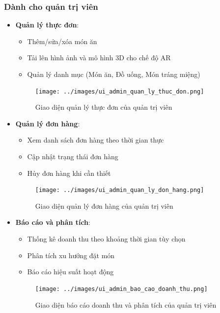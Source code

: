 \documentclass[12pt,a4paper]{article}
\begin{document}
\subsubsection{Dành cho quản trị viên}
\begin{itemize}[leftmargin=1cm]
    \item \textbf{Quản lý thực đơn}:
        \begin{itemize}[leftmargin=0.5cm]
            \item Thêm/sửa/xóa món ăn
            \item Tải lên hình ảnh và mô hình 3D cho chế độ AR
            \item Quản lý danh mục (Món ăn, Đồ uống, Món tráng miệng)
        \end{itemize}
\begin{figure}[H]
    \centering
    \texttt{[image: ../images/ui\_admin\_quan\_ly\_thuc\_don.png]} %
    \caption{Giao diện quản lý thực đơn của quản trị viên}
    \label{fig:ui_admin_menu}
\end{figure}

    \item \textbf{Quản lý đơn hàng}:
        \begin{itemize}[leftmargin=0.5cm]
            \item Xem danh sách đơn hàng theo thời gian thực
            \item Cập nhật trạng thái đơn hàng
            \item Hủy đơn hàng khi cần thiết
        \end{itemize}
\begin{figure}[H]
    \centering
    \texttt{[image: ../images/ui\_admin\_quan\_ly\_don\_hang.png]} %
    \caption{Giao diện quản lý đơn hàng của quản trị viên}
    \label{fig:ui_admin_orders}
\end{figure}

    \item \textbf{Báo cáo và phân tích}:
        \begin{itemize}[leftmargin=0.5cm]
            \item Thống kê doanh thu theo khoảng thời gian tùy chọn
            \item Phân tích xu hướng đặt món
            \item Báo cáo hiệu suất hoạt động
        \end{itemize}
\begin{figure}[H]
    \centering
    \texttt{[image: ../images/ui\_admin\_bao\_cao\_doanh\_thu.png]} %
    \caption{Giao diện báo cáo doanh thu và phân tích của quản trị viên}
    \label{fig:ui_admin_revenue}
\end{figure}


\end{itemize}
\end{document}

